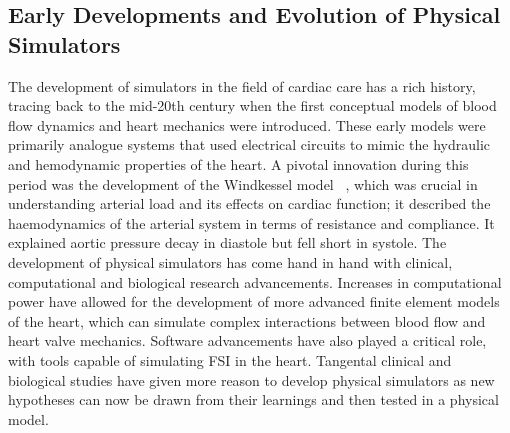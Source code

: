 \subsection{Early Developments and Evolution of Physical Simulators}
The development of simulators in the field of cardiac care has a rich history, tracing back to the mid-20th century when the first conceptual models of blood flow dynamics and heart mechanics were introduced. These early models were primarily analogue systems that used electrical circuits to mimic the hydraulic and hemodynamic properties of the heart. A pivotal innovation during this period was the development of the Windkessel model ~, which was crucial in understanding arterial load and its effects on cardiac function; it described the haemodynamics of the arterial system in terms of resistance and compliance. It explained aortic pressure decay in diastole but fell short in systole.
The development of physical simulators has come hand in hand with clinical, computational and biological research advancements. Increases in computational power have allowed for the development of more advanced finite element models of the heart, which can simulate complex interactions between blood flow and heart valve mechanics. Software advancements have also played a critical role, with tools capable of simulating \gls{FSI} in the heart. Tangental clinical and biological studies have given more reason to develop physical simulators as new hypotheses can now be drawn from their learnings and then tested in a physical model.

